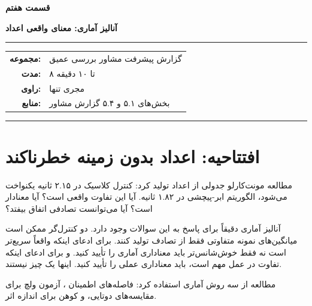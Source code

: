 \documentclass[12pt, a4paper]{article}
\newcommand{\dash}{\lr{---}}
\begin{document}

\thispagestyle{empty}

\vspace*{1.2cm}

{\centering
{\color{seriesblue}\fontsize{24}{30}\selectfont\bfseries قسمت هفتم}

\vspace{0.5cm}
{\fontsize{15}{20}\selectfont\bfseries آناليز آماری: معنای واقعی اعداد}

\vspace{0.9cm}
{\color{seriesblue}\rule{0.55\linewidth}{1pt}}
\vspace{0.7cm}

{\normalsize
\begin{tabular}{rl}
  \textbf{مجموعه:}     & گزارش پيشرفت مشاور \dash{} بررسی عمیق \\[5pt]
  \textbf{مدت:}        & ۸ تا ۱۰ دقیقه \\[5pt]
  \textbf{راوی:}       & مجری تنها \\[5pt]
  \textbf{منابع:}      & بخش‌های ۵.۱ و ۵.۴ گزارش مشاور \\
\end{tabular}
}

\vspace{0.9cm}
{\color{seriesblue}\rule{0.55\linewidth}{0.4pt}}
\par}

\vspace{1.2cm}

\section{افتتاحیه: اعداد بدون زمينه خطرناکند}

مطالعه مونت‌کارلو جدولی از اعداد توليد کرد: کنترل کلاسيک در ۲.۱۵ ثانيه يکنواخت می‌شود، الگوريتم ابر-پيچشی در ۱.۸۲ ثانيه. آيا اين تفاوت واقعی است؟ آيا معنادار است؟ آيا می‌توانست تصادفی اتفاق بيفتد؟

آناليز آماری دقيقاً برای پاسخ به اين سوالات وجود دارد. دو کنترل‌گر ممکن است ميانگين‌های نمونه متفاوتی فقط از تصادف توليد کنند. برای ادعای اينکه  واقعاً سريع‌تر است \dash{} نه فقط خوش‌شانس‌تر \dash{} بايد معناداری آماری را تأييد کنيد. و برای ادعای اينکه تفاوت در عمل مهم است، بايد معناداری عملی را تأييد کنيد. اينها يک چيز نيستند.

مطالعه  از سه روش آماری استفاده کرد: فاصله‌های اطمينان ، آزمون  ولچ برای مقايسه‌های دوتايی، و  کوهن برای اندازه اثر.
\end{document}
